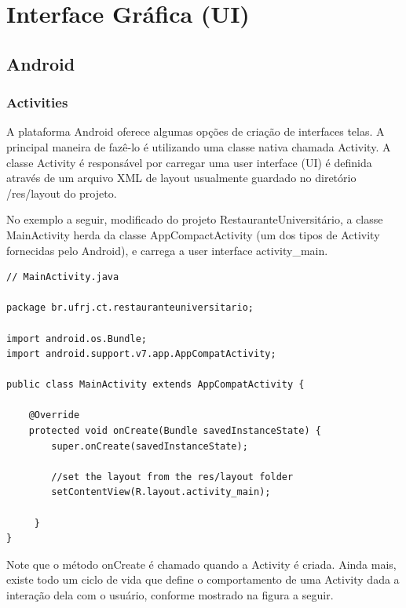 \chapter{Interface Gráfica (UI)}

\section{Android}
\subsection{Activities}
A plataforma Android oferece algumas opções de criação de interfaces telas. A principal maneira de 
fazê-lo é utilizando uma classe nativa chamada Activity. A classe Activity é responsável por carregar uma 
user interface (UI) é definida através de um arquivo XML de layout usualmente guardado no diretório 
/res/layout do projeto.

No exemplo a seguir, modificado do projeto RestauranteUniversitário, a classe MainActivity herda da classe
AppCompactActivity (um dos tipos de Activity fornecidas pelo Android), e carrega a user interface 
activity\_main.


\lstset{language=Java}

\begin{lstlisting}
// MainActivity.java

package br.ufrj.ct.restauranteuniversitario;

import android.os.Bundle;
import android.support.v7.app.AppCompatActivity;

public class MainActivity extends AppCompatActivity {
    
    @Override
    protected void onCreate(Bundle savedInstanceState) {
        super.onCreate(savedInstanceState);

        //set the layout from the res/layout folder
        setContentView(R.layout.activity_main);
        
     }
}

\end{lstlisting}

Note que o método onCreate é chamado quando a Activity é criada. Ainda mais, existe 
todo um ciclo de vida que define o comportamento de uma Activity dada a interação dela com o 
usuário, conforme mostrado na figura a seguir.

